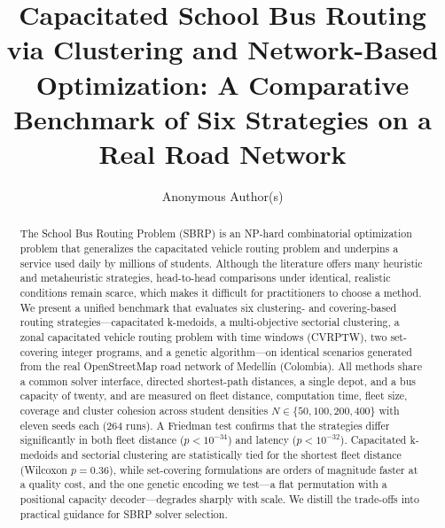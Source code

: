 \documentclass[runningheads]{llncs}
\begin{document}
\title{Capacitated School Bus Routing via Clustering and
Network-Based Optimization: A Comparative Benchmark of Six Strategies
on a Real Road Network}


\author{Anonymous Author(s)}

\maketitle

\begin{abstract}
The School Bus Routing Problem (SBRP) is an NP-hard combinatorial
optimization problem that generalizes the capacitated vehicle routing
problem and underpins a service used daily by millions of students.
Although the literature offers many heuristic and metaheuristic
strategies, head-to-head comparisons under identical, realistic
conditions remain scarce, which makes it difficult for practitioners
to choose a method. We present a unified benchmark that evaluates six
clustering- and covering-based routing strategies---capacitated
k-medoids, a multi-objective sectorial clustering, a zonal
capacitated vehicle routing problem with time windows (CVRPTW), two
set-covering integer programs, and a genetic algorithm---on identical
scenarios generated from the real OpenStreetMap road network of
Medell\'in (Colombia). All methods share a common solver interface,
directed shortest-path distances, a single depot, and a bus capacity
of twenty, and are measured on fleet distance, computation time,
fleet size, coverage and cluster cohesion across student densities
$N\in\{50,100,200,400\}$ with eleven seeds each (264 runs). A Friedman
test confirms that the strategies differ significantly in both fleet
distance ($p<10^{-34}$) and latency ($p<10^{-32}$). Capacitated
k-medoids and sectorial clustering are statistically tied for the
shortest fleet distance (Wilcoxon $p=0.36$), while set-covering
formulations are orders of magnitude faster at a quality cost, and the
one genetic encoding we test---a flat permutation with a positional
capacity decoder---degrades sharply with scale. We distill the
trade-offs into practical guidance for SBRP solver selection.

\end{abstract}
\end{document}
